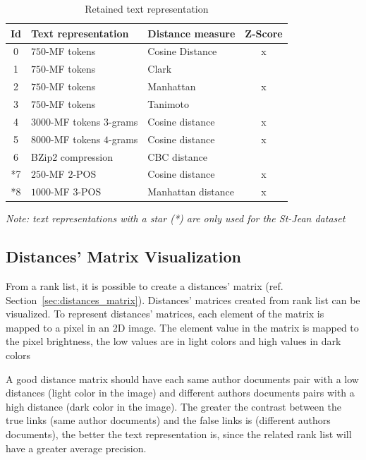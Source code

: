 \begin{table}
  \centering
  \caption{Retained text representation}
  \label{tab:9rl}
  \begin{tabular}{c l l c}
    \toprule
    Id &
    Text representation &
    Distance measure &
    Z-Score \\
    \midrule
    0 & $750$-MF tokens & Cosine Distance & x\\
    1 & $750$-MF tokens & Clark & \\
    2 & $750$-MF tokens & Manhattan & x\\
    3 & $750$-MF tokens & Tanimoto & \\
    4 & $3000$-MF tokens $3$-grams & Cosine distance & x\\
    5 & $8000$-MF tokens $4$-grams & Cosine distance & x\\
    6 & BZip2 compression & CBC distance & \\
    *7 & $250$-MF $2$-POS & Cosine distance & x\\
    *8 & $1000$-MF $3$-POS & Manhattan distance & x\\
    \bottomrule
  \end{tabular}

  \vspace{0.2cm}
  \textit{Note: text representations with a star (*) are only used for the St-Jean dataset}
\end{table}

\subsection{Distances' Matrix Visualization}

From a rank list, it is possible to create a distances' matrix (ref. Section~\ref{sec:distances_matrix}).
Distances' matrices created from rank list can be visualized.
To represent distances' matrices, each element of the matrix is mapped to a pixel in an 2D image.
The element value in the matrix is mapped to the pixel brightness, the low values are in light colors and high values in dark colors

A good distance matrix should have each same author documents pair with a low distances (light color in the image) and different authors documents pairs with a high distance (dark color in the image).
The greater the contrast between the true links (same author documents) and the false links is (different authors documents), the better the text representation is, since the related rank list will have a greater average precision.

